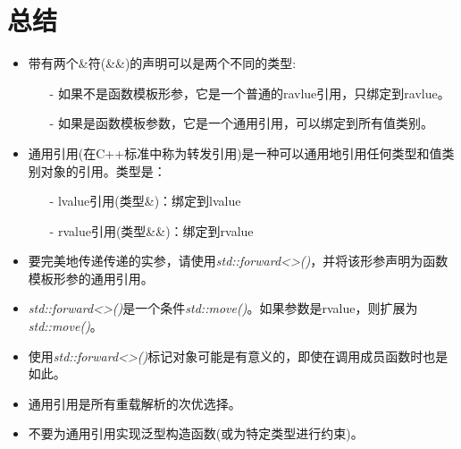 \section{总结}
\begin{itemize}
	\item 带有两个\&符(\&\&)的声明可以是两个不同的类型:
	\begin{itemize}
		\item[-] 如果不是函数模板形参，它是一个普通的ravlue引用，只绑定到ravlue。
		\item[-] 如果是函数模板参数，它是一个通用引用，可以绑定到所有值类别。
	\end{itemize}
	\item 通用引用(在C++标准中称为转发引用)是一种可以通用地引用任何类型和值类别对象的引用。类型是：
		\begin{itemize}
		\item[-] lvalue引用(类型\&)：绑定到lvalue
		\item[-] rvalue引用(类型\&\&)：绑定到rvalue
	\end{itemize}
	\item 要完美地传递传递的实参，请使用\textit{std::forward<>()}，并将该形参声明为函数模板形参的通用引用。
	\item \textit{std::forward<>()}是一个条件\textit{std::move()}。如果参数是rvalue，则扩展为\textit{std::move()}。
	\item 使用\textit{std::forward<>()}标记对象可能是有意义的，即使在调用成员函数时也是如此。
	\item 通用引用是所有重载解析的次优选择。
	\item 不要为通用引用实现泛型构造函数(或为特定类型进行约束)。
\end{itemize}


